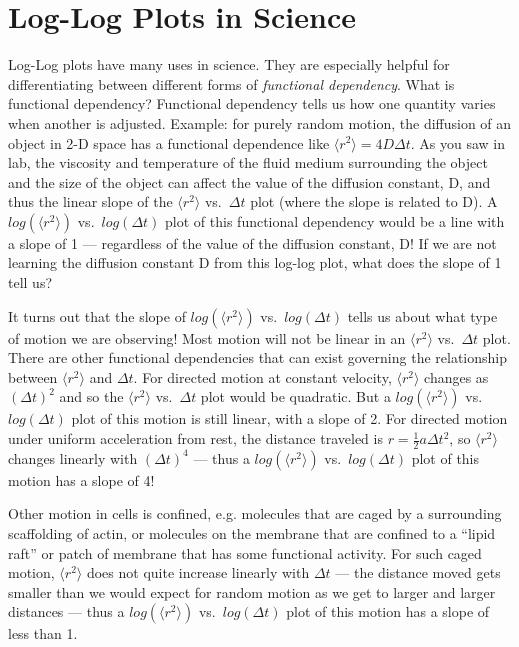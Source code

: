 \section{Log-Log Plots in Science}
Log-Log plots have many uses in science.
They are especially helpful for differentiating between different forms of \emph{functional dependency}.
What is functional dependency? 
Functional dependency tells us how one quantity varies when another is adjusted. 
Example: for purely random motion, the diffusion of an object in 2-D space has a functional dependence like $\langle r^{2} \rangle = 4 D \Delta t$. 
As you saw in lab, the viscosity and temperature of the fluid medium surrounding the object and the size of the object can affect the value of the diffusion constant, D, and thus the linear slope of the $\langle r^{2} \rangle$ vs.\ $\Delta t$ plot (where the slope is related to D). 
A $log(\langle r^{2} \rangle)$ vs.\ $log(\Delta t)$ plot of this functional dependency would be a line with a slope of 1 — regardless of the value of the diffusion constant, D! 
If we are not learning the diffusion constant D from this log-log plot, what does the slope of 1 tell us?
\par 
It turns out that the slope of $log(\langle r^{2} \rangle)$ vs.\ $log(\Delta t)$ tells us about what type of motion we are observing! 
Most motion will not be linear in an $\langle r^{2} \rangle$ vs.\ $\Delta t$ plot. 
There are other functional dependencies that can exist governing the relationship between $\langle r^{2} \rangle$ and $\Delta t$. 
For directed motion at constant velocity, $\langle r^{2} \rangle$ changes as $(\Delta t)^{2}$ and so the $\langle r^{2} \rangle$ vs.\ $\Delta t$ plot would be quadratic. 
But a $log(\langle r^{2} \rangle)$ vs.\ $log(\Delta t)$ plot of this motion is still linear, with a slope of 2. 
For directed motion under uniform acceleration from rest, the distance traveled is $r = \frac{1}{2} a \Delta t^{2}$, so $\langle r^{2} \rangle$ changes linearly with $(\Delta t)^{4}$ — thus a $log(\langle r^{2} \rangle)$ vs.\ $log(\Delta t)$ plot of this motion has a slope of 4!
\par 
Other motion in cells is confined, e.g. molecules that are caged by a surrounding scaffolding of actin, or molecules on the membrane that are confined to a ``lipid raft'' or patch of membrane that has some functional activity. 
For such caged motion, $\langle r^{2} \rangle$ does not quite increase linearly with $\Delta t$ — the distance moved gets smaller than we would expect for random motion as we get to larger and larger distances — thus a $log(\langle r^{2} \rangle)$ vs.\ $log(\Delta t)$ plot of this motion has a slope of less than 1.
